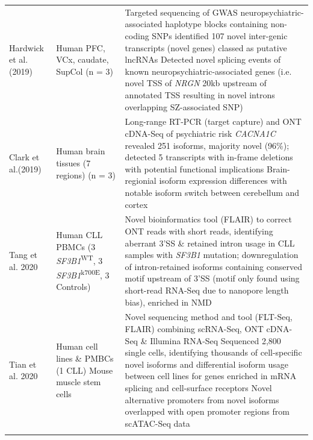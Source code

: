 \begin{changemargin}{1.5cm}
\begin{landscape}
\begin{longtable}[c]{p{4cm}p{4cm}p{18cm}}
			\centering Hardwick et al. (2019) \cite{Hardwick2019a} &
			\centering Human PFC, VCx, \newline caudate, SupCol (n = 3)  &
			\tabitem Targeted sequencing of GWAS neuropsychiatric-associated haplotype blocks containing non-coding SNPs identified 107 novel inter-genic transcripts (novel genes) classed as putative lncRNAs \newline 
			\tabitem Detected novel splicing events of known neuropsychiatric-associated genes (i.e. novel TSS of \textit{NRGN} 20kb upstream of annotated TSS resulting in novel introns overlapping SZ-associated SNP)  \\
			\hdashline[0.5pt/5pt]
			
			\centering Clark et al.(2019) \cite{Clark2019} &
			\centering Human brain tissues \newline (7 regions) (n = 3) &
			\tabitem Long-range RT-PCR (target capture) and ONT cDNA-Seq of psychiatric risk \textit{CACNA1C} revealed 251 isoforms, majority novel (96\%); detected 5 transcripts with in-frame deletions with potential functional implications  \newline 
			\tabitem Brain-regionial isoform expression differences with notable isoform switch between cerebellum and cortex  \\
			
			\centering Tang et al. 2020 \cite{Tang2020} &
			\centering Human CLL PBMCs \newline (3 \textit{SF3B1}\textsuperscript{WT}, 3 \textit{SF3B1}\textsuperscript{k700E}, 3 Controls) &
			\tabitem Novel bioinformatics tool (FLAIR) to correct ONT reads with short reads, identifying aberrant 3'SS \& retained intron usage in CLL samples with \textit{SF3B1} mutation; downregulation of intron-retained isoforms containing conserved motif upstream of 3'SS (motif only found using short-read RNA-Seq due to nanopore length bias), enriched in NMD  \\
			\hdashline[0.5pt/5pt]
			
			\centering Tian et al. 2020 \cite{Tian2020} &
			\centering Human cell lines \& PMBCs (1 CLL) \newline Mouse muscle stem cells &
			\tabitem Novel sequencing method and tool (FLT-Seq, FLAIR) combining scRNA-Seq, ONT cDNA-Seq \& Illumina RNA-Seq \newline 
			\tabitem Sequenced 2,800 single cells, identifying thousands of cell-specific novel isoforms and differential isoform usage between cell lines for genes enriched in mRNA splicing and cell-surface receptors \newline 
			\tabitem Novel alternative promoters from novel isoforms overlapped with open promoter regions from scATAC-Seq data\\
			\hdashline[0.5pt/5pt]
			

\end{longtable}
\end{landscape}
\end{changemargin}

